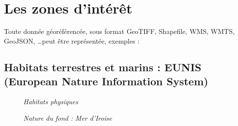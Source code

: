 \section{Les zones d'intérêt}
Toute donnée géoréférencée, sous format GeoTIFF, Shapefile, WMS, WMTS, GeoJSON, \ldots peut être représentée, exemples :
\subsection{Habitats terrestres et marins : EUNIS 
(European Nature Information System)}
\begin{center}
\begin{figure}[ht]
\caption{\label{sedimento0}\textit{Habitats physiques}}
\end{figure}
\end{center}
\begin{center}
\begin{figure}[ht]
\caption{\label{sedimento1}\textit{Nature du fond : Mer d'Iroise}}
\end{figure}
\end{center}

